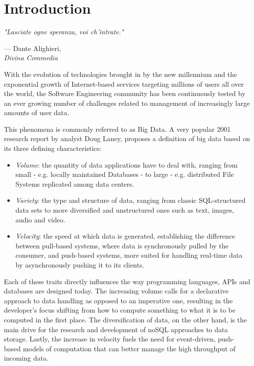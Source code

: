 \let\textcircled=\pgftextcircled
\chapter*[Introduction]{Introduction}
\label{chap:intro}

\epigraph{\hspace{4ex}\textit{"Lasciate ogne speranza, voi ch'intrate."}}{--- Dante Alighieri,\\ \textit{Divina Commedia}}

 
With the evolution of technologies brought in by the new millennium and the exponential growth of Internet-based services targeting millions of users all over the world, the Software Engineering community has been continuously tested by an ever growing number of challenges related to management of increasingly large amounts of user data\cite{furht2010handbook}. 

This phenomena is commonly referred to as Big Data. A very popular 2001 research report\cite{laney20013d} by analyst Doug Laney, proposes a definition of big data based on its three defining characteristics:

\begin{itemize}
\item \textit{Volume}: the quantity of data applications have to deal with, ranging from small - e.g. locally maintained Databases - to large - e.g. distributed File Systems replicated among data centers.
\item \textit{Variety}: the type and structure of data, ranging from classic SQL-structured data sets to more diversified and unstructured ones such as text, images, audio and  video. 
\item \textit{Velocity}: the speed at which data is generated, establishing the difference between pull-based systems, where data is synchronously pulled by the consumer, and push-based systems, more suited for handling real-time data by asynchronously pushing it to its clients.
\end{itemize}

Each of these traits directly influences the way programming languages, APIs and databases are designed today. The increasing volume calls for a declarative approach to data handling as opposed to an imperative one, resulting in the developer's focus shifting from how to compute something to what it is to be computed in the first place\cite{fahland2009declarative}. The diversification of data, on the other hand, is the main drive for the research and development of noSQL approaches to data storage. Lastly, the increase in velocity fuels the need for event-driven, push-based models of computation that can better manage the high throughput of incoming data\cite{meijer2012your}. 

